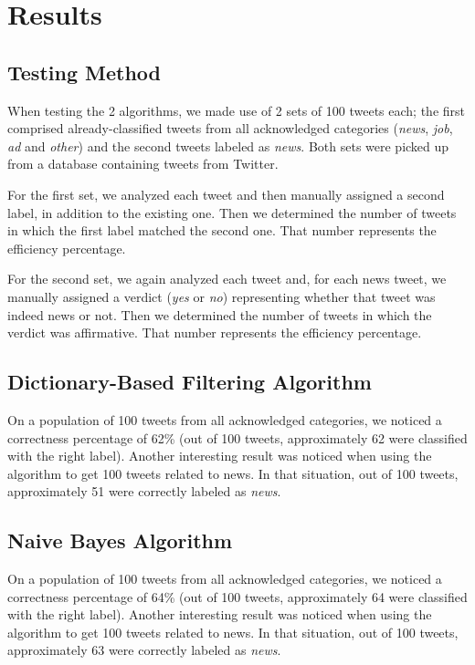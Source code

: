 \documentclass{article}
\begin{document}
\section{Results}

\subsection{Testing Method}
\large{
\quad
When testing the 2 algorithms, we made use of 2 sets of 100 tweets each; the first comprised already-classified tweets from all acknowledged categories (\textit{news}, \textit{job}, \textit{ad} and \textit{other}) and the second tweets labeled as \textit{news}. Both sets were picked up from a database containing tweets from Twitter.

\quad
For the first set, we analyzed each tweet and then manually assigned a second label, in addition to the existing one. Then we determined the number of tweets in which the first label matched the second one. That number represents the efficiency percentage.

\quad
For the second set, we again analyzed each tweet and, for each news tweet, we manually assigned a verdict (\textit{yes} or \textit{no}) representing whether that tweet was indeed news or not. Then we determined the number of tweets in which the verdict was affirmative. That number represents the efficiency percentage.
}


\subsection{Dictionary-Based Filtering Algorithm}
\large
{
\quad
On a population of 100 tweets from all acknowledged categories, we noticed a correctness percentage of 62\% (out of 100 tweets, approximately 62 were classified with the right label). Another interesting result was noticed when using the algorithm to get 100 tweets related to news. In that situation, out of 100 tweets, approximately 51 were correctly labeled as \textit{news}.
}

\subsection{Naive Bayes Algorithm}
\large
{
\quad
On a population of 100 tweets from all acknowledged categories, we noticed a correctness percentage of 64\% (out of 100 tweets, approximately 64 were classified with the right label). Another interesting result was noticed when using the algorithm to get 100 tweets related to news. In that situation, out of 100 tweets, approximately 63 were correctly labeled as \textit{news}.
}
\end{document}
